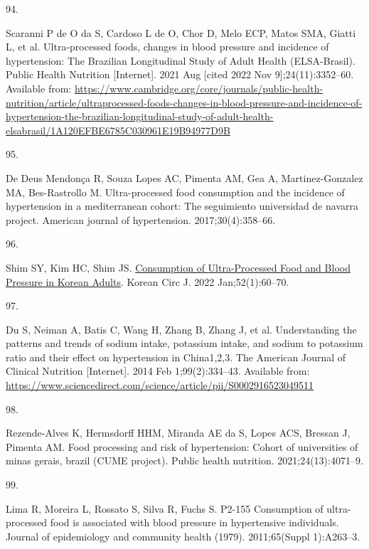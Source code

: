 \documentclass[
]{article}
\newlength{\cslhangindent}
\newlength{\csllabelwidth}
\newlength{\cslentryspacingunit} %
\newenvironment{CSLReferences}[2] %
 {%
  \setlength{\parindent}{0pt}
  \ifodd #1
  \let\oldpar\par
  \def\par{\hangindent=\cslhangindent\oldpar}
  \fi
  \setlength{\parskip}{#2\cslentryspacingunit}
 }%
 {}
\newcommand{\CSLLeftMargin}[1]{\parbox[t]{\csllabelwidth}{#1}}
\newcommand{\CSLRightInline}[1]{\parbox[t]{\linewidth - \csllabelwidth}{#1}\break}
\begin{document}
\begin{CSLReferences}{0}{0}
\leavevmode{}%
\CSLLeftMargin{94. }%
\CSLRightInline{Scaranni P de O da S, Cardoso L de O, Chor D, Melo ECP,
Matos SMA, Giatti L, et al. Ultra-processed foods, changes in blood
pressure and incidence of hypertension: The {Brazilian Longitudinal
Study} of {Adult Health} ({ELSA-Brasil}). Public Health Nutrition
{[}Internet{]}. 2021 Aug {[}cited 2022 Nov 9{]};24(11):3352--60.
Available from:
\url{https://www.cambridge.org/core/journals/public-health-nutrition/article/ultraprocessed-foods-changes-in-blood-pressure-and-incidence-of-hypertension-the-brazilian-longitudinal-study-of-adult-health-elsabrasil/1A120EFBE6785C030961E19B94977D9B}}

\leavevmode{}%
\CSLLeftMargin{95. }%
\CSLRightInline{De Deus Mendonça R, Souza Lopes AC, Pimenta AM, Gea A,
Martinez-Gonzalez MA, Bes-Rastrollo M. Ultra-processed food consumption
and the incidence of hypertension in a mediterranean cohort: The
seguimiento universidad de navarra project. American journal of
hypertension. 2017;30(4):358--66. }

\leavevmode{}%
\CSLLeftMargin{96. }%
\CSLRightInline{Shim SY, Kim HC, Shim JS.
\href{https://doi.org/10.4070/kcj.2021.0228}{Consumption of
{Ultra-Processed Food} and {Blood Pressure} in {Korean Adults}}. Korean
Circ J. 2022 Jan;52(1):60--70. }

\leavevmode{}%
\CSLLeftMargin{97. }%
\CSLRightInline{Du S, Neiman A, Batis C, Wang H, Zhang B, Zhang J, et
al. Understanding the patterns and trends of sodium intake, potassium
intake, and sodium to potassium ratio and their effect on hypertension
in China1,2,3. The American Journal of Clinical Nutrition
{[}Internet{]}. 2014 Feb 1;99(2):334--43. Available from:
\url{https://www.sciencedirect.com/science/article/pii/S0002916523049511}}

\leavevmode{}%
\CSLLeftMargin{98. }%
\CSLRightInline{Rezende-Alves K, Hermsdorff HHM, Miranda AE da S, Lopes
ACS, Bressan J, Pimenta AM. Food processing and risk of hypertension:
{Cohort} of universities of minas gerais, brazil ({CUME} project).
Public health nutrition. 2021;24(13):4071--9. }

\leavevmode{}%
\CSLLeftMargin{99. }%
\CSLRightInline{Lima R, Moreira L, Rossato S, Silva R, Fuchs S. P2-155
Consumption of ultra-processed food is associated with blood pressure in
hypertensive individuals. Journal of epidemiology and community health
(1979). 2011;65(Suppl 1):A263--3. }


\end{CSLReferences}
\end{document}
